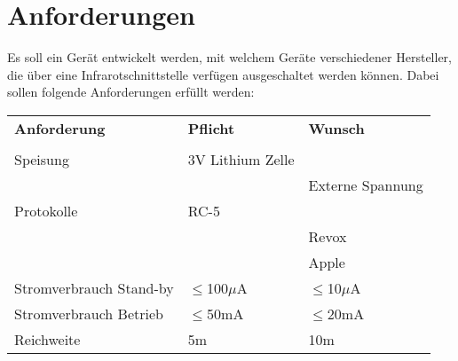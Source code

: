 



\section{Anforderungen}
Es soll ein Gerät entwickelt werden, mit welchem Geräte verschiedener 
Hersteller, die über eine Infrarotschnittstelle verfügen ausgeschaltet 
werden können. Dabei sollen folgende Anforderungen erfüllt werden: 

\begin{table}[h!]
  \begin{tabular}{@{}p{}p{}p{}}
    \rowcolor{white} \textbf{Anforderung}     & \textbf{Pflicht} & \textbf{Wunsch}\\
                                              &                  &                \\
    \rowcolor{white} Speisung                 & 3V Lithium Zelle &                \\
    \rowcolor{white}                          &                  & Externe Spannung\\
    \rowcolor{lgray} Protokolle               & RC-5             &                \\
    \rowcolor{lgray}                          &                  & Revox          \\
    \rowcolor{lgray}                          &                  & Apple          \\
    \rowcolor{white} Stromverbrauch Stand-by  & $\leq$100$\mu$A  & $\leq$10$\mu$A \\
    \rowcolor{lgray} Stromverbrauch Betrieb   & $\leq$50mA       & $\leq$20mA     \\
    \rowcolor{white} Reichweite               & 5m               & 10m            \\
  \end{tabular}
  \label{tab:anforderungen}
\end{table}
